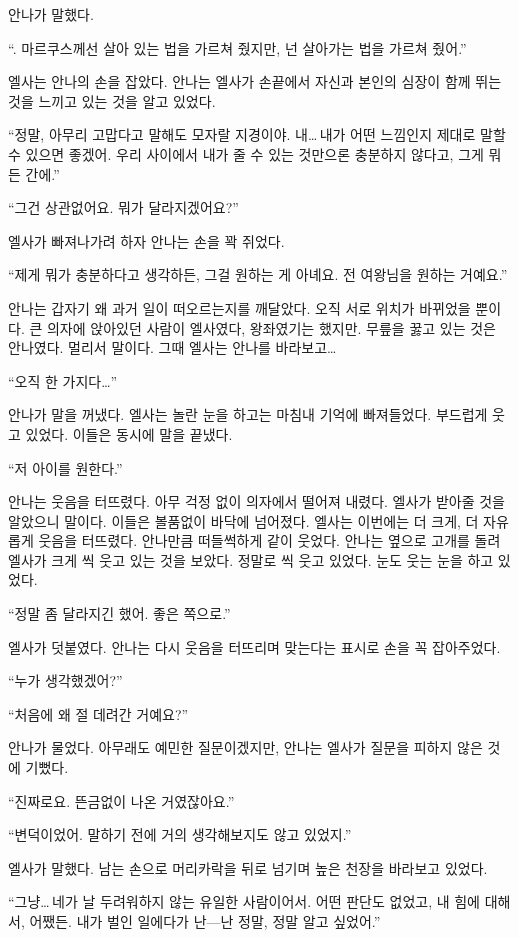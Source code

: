 안나가 말했다.

``. 마르쿠스께선 살아 있는 법을 가르쳐 줬지만, 넌 살아가는 법을 가르쳐 줬어.''

엘사는 안나의 손을 잡았다. 안나는 엘사가 손끝에서 자신과 본인의 심장이 함께 뛰는 것을 느끼고 있는 것을 알고 있었다.

``정말, 아무리 고맙다고 말해도 모자랄 지경이야. 내\ldots\,내가 어떤 느낌인지 제대로 말할 수 있으면 좋겠어. 우리 사이에서 내가 줄 수 있는 것만으론 충분하지 않다고, 그게 뭐든 간에.''

``그건 상관없어요. 뭐가 달라지겠어요?''

엘사가 빠져나가려 하자 안나는 손을 꽉 쥐었다.

``제게 뭐가 충분하다고 생각하든, 그걸 원하는 게 아녜요. 전 여왕님을 원하는 거예요.''

안나는 갑자기 왜 과거 일이 떠오르는지를 깨달았다. 오직 서로 위치가 바뀌었을 뿐이다. 큰 의자에 앉아있던 사람이 엘사였다, 왕좌였기는 했지만. 무릎을 꿇고 있는 것은 안나였다. 멀리서 말이다. 그때 엘사는 안나를 바라보고\ldots

``오직 한 가지다\ldots''

안나가 말을 꺼냈다. 엘사는 놀란 눈을 하고는 마침내 기억에 빠져들었다. 부드럽게 웃고 있었다. 이들은 동시에 말을 끝냈다.

``저 아이를 원한다.''

안나는 웃음을 터뜨렸다. 아무 걱정 없이 의자에서 떨어져 내렸다. 엘사가 받아줄 것을 알았으니 말이다. 이들은 볼품없이 바닥에 넘어졌다. 엘사는 이번에는 더 크게, 더 자유롭게 웃음을 터뜨렸다. 안나만큼 떠들썩하게 같이 웃었다. 안나는 옆으로 고개를 돌려 엘사가 크게 씩 웃고 있는 것을 보았다. 정말로 씩 웃고 있었다. 눈도 웃는 눈을 하고 있었다.

``정말 좀 달라지긴 했어. 좋은 쪽으로.''

엘사가 덧붙였다. 안나는 다시 웃음을 터뜨리며 맞는다는 표시로 손을 꼭 잡아주었다.

``누가 생각했겠어?''

``처음에 왜 절 데려간 거예요?''

안나가 물었다. 아무래도 예민한 질문이겠지만, 안나는 엘사가 질문을 피하지 않은 것에 기뻤다.

``진짜로요. 뜬금없이 나온 거였잖아요.''

``변덕이었어. 말하기 전에 거의 생각해보지도 않고 있었지.''

엘사가 말했다. 남는 손으로 머리카락을 뒤로 넘기며 높은 천장을 바라보고 있었다.

``그냥\ldots\,네가 날 두려워하지 않는 유일한 사람이어서. 어떤 판단도 없었고, 내 힘에 대해서, 어쨌든. 내가 벌인 일에다가 난—난 정말, 정말 알고 싶었어.''

